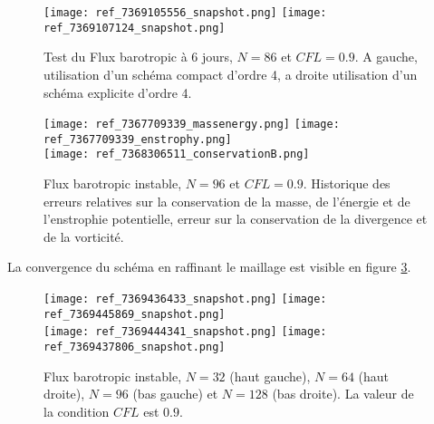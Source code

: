 \begin{figure}[htbp]
\begin{center}
\texttt{[image: ref\_7369105556\_snapshot.png]}
\texttt{[image: ref\_7369107124\_snapshot.png]}
\end{center}
\caption{Test du Flux barotropic \cite{Galewsky2004} à 6 jours, $N=86$ et $CFL=0.9$. A gauche, utilisation d'un schéma compact d'ordre 4, a droite utilisation d'un schéma explicite d'ordre 4.}
\label{fig: galewsky compact/explicite}
\end{figure}

\begin{figure}[htbp]
\begin{center}
\texttt{[image: ref\_7367709339\_massenergy.png]}
\texttt{[image: ref\_7367709339\_enstrophy.png]}\\
\texttt{[image: ref\_7368306511\_conservationB.png]}
\end{center}
\caption{Flux barotropic instable, $N=96$ et $CFL=0.9$. Historique des erreurs relatives sur la conservation de la masse, de l'énergie et de l'enstrophie potentielle, erreur sur la conservation de la divergence et de la vorticité.}
\label{fig: galewsky conservation}
\end{figure}

La convergence du schéma en raffinant le maillage est visible en figure \ref{fig: galewsky convergence}.

\begin{figure}[htbp]
\begin{center}
\texttt{[image: ref\_7369436433\_snapshot.png]}
\texttt{[image: ref\_7369445869\_snapshot.png]}\\
\texttt{[image: ref\_7369444341\_snapshot.png]}
\texttt{[image: ref\_7369437806\_snapshot.png]}
\end{center}
\caption{Flux barotropic instable, $N=32$ (haut gauche), $N=64$ (haut droite), $N=96$ (bas gauche) et $N=128$ (bas droite). La valeur de la condition $CFL$ est $0.9$.}
\label{fig: galewsky convergence}
\end{figure}






















